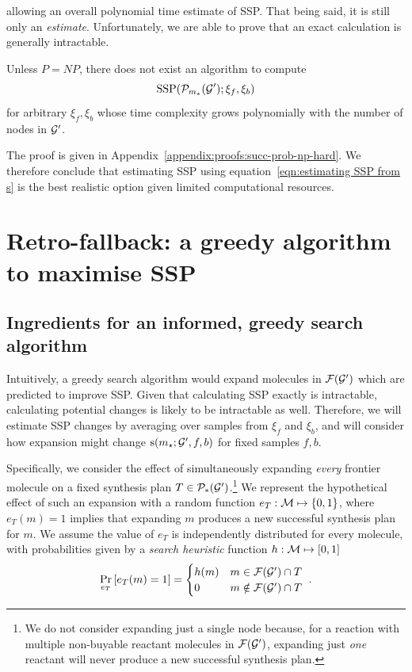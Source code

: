 allowing an overall polynomial time estimate of SSP.
That being said, it is still only an \emph{estimate}.
Unfortunately, we are able to prove that an exact calculation is generally intractable.
\begin{theorem}\label{thm:success prob is NP hard}
    Unless $P=NP$, there does not exist an algorithm to compute 
    \begin{equation*}
        \mathrm{SSP}(\mathcal{P}_{m_\star}({\mathcal{G}}') ; \xi_f, \xi_b)  
    \end{equation*}
    for arbitrary
    $\xi_f,\xi_b$ whose time complexity grows polynomially with the number of nodes
    in ${\mathcal{G}}'$.
\end{theorem}
The proof is given in Appendix~\ref{appendix:proofs:succ-prob-np-hard}.
We therefore conclude that estimating SSP using equation~\ref{eqn:estimating SSP from s}
is the best realistic option given limited computational resources.

\section{Retro-fallback: a greedy algorithm to maximise SSP}\label{sec:retro fallback}


\subsection{Ingredients for an informed, greedy search algorithm}\label{sec:retro fallback ingredients}

Intuitively, a greedy search algorithm would expand molecules in $\mathcal{F}({\mathcal{G}}')$
which are predicted to improve SSP.
Given that calculating SSP exactly is intractable,
calculating potential changes is likely to be intractable as well.
Therefore, we will estimate SSP changes by averaging over samples 
from $\xi_f$ and $\xi_b$,
and will consider how expansion might change ${\textnormal{s}}(m_\star;{\mathcal{G}}',f,b)$
for fixed  samples $f,b$.

Specifically, we consider the effect of simultaneously expanding \emph{every} frontier
molecule on a fixed synthesis plan $T\in\mathcal{P}_{*}({\mathcal{G}}')$.\footnote{
    We do not consider expanding just a single node because,
    for a reaction with multiple non-buyable reactant molecules in $\mathcal{F}({\mathcal{G}}')$,
    expanding just \emph{one} reactant will never produce a new successful synthesis plan.
}
We represent the hypothetical effect of such an expansion
with a random function $e_{T}:{\mathcal{M}}\mapsto\{0,1\}$,
where $e_{T}(m)=1$ implies that expanding $m$ produces a new successful synthesis plan for $m$.
We assume the value of $e_{T}$ is independently distributed for every molecule,
with probabilities given by
a \emph{search heuristic} function
$h:{\mathcal{M}}\mapsto[0,1]$
\begin{equation}\label{eqn:eT expansion function}
    \Pr_{e_{T}}\left[e_{T}(m)=1\right] =
    \begin{cases}
        h(m) & m\in\mathcal{F}({\mathcal{G}}')\cap {T} \\
        0 & m\notin\mathcal{F}({\mathcal{G}}')\cap {T}
    \end{cases} \ .
\end{equation}

